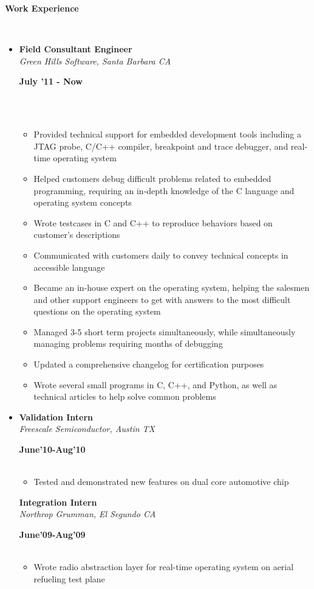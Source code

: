 \documentclass[a4paper,11pt]{article}
\newcommand{\isep}{-2 pt}
\newcommand{\lsep}{-0.5cm}
\newcommand{\resheading}[1]{{\small \colorbox{mygrey}{\begin{minipage}{0.975\textwidth}{\textbf{#1 \vphantom{p\^{E}}}}\end{minipage}}}}
\newcommand{\workexp}[4]{
\begin{minipage}[t]{7cm}
\flushleft
\textbf{#1} \\
\indent \emph{#2}\\
\end{minipage}
\begin{minipage}[t]{7cm}
\flushright
\textbf{#3} \\
\indent #4 \\
\end{minipage}
}
\begin{document}
\resheading{\textbf{Work Experience} }\\[\lsep]
\begin{itemize}
\item 
\workexp{Field Consultant Engineer}{Green Hills Software, Santa Barbara CA}{July '11 - Now}{}
\\[-0.2cm]
	\begin{itemize}\itemsep \isep
	\item Provided technical support for embedded development tools including a JTAG probe, C/C++ compiler, breakpoint and trace debugger, and real-time operating system
	\item Helped customers debug difficult problems related to embedded programming, requiring an in-depth knowledge of the C language and operating system concepts
	\item Wrote testcases in C and C++ to reproduce behaviors based on customer's descriptions
	\item Communicated with customers daily to convey technical concepts in accessible language
	\item Became an in-house expert on the operating system, helping the salesmen and other support engineers to get with answers to the most difficult  questions on the operating system
	\item Managed 3-5 short term projects simultaneously, while simultaneously managing problems requiring months of debugging
	\item Updated a comprehensive changelog for certification purposes
	\item Wrote several small programs  in C, C++, and Python, as well as technical articles to help solve common problems
	\end{itemize}

\item
\workexp{Validation Intern}{Freescale Semiconductor, Austin TX}{June'10-Aug'10}{}
	\begin{itemize}\itemsep \isep
	\item Tested and demonstrated new features on dual core automotive chip
	\end{itemize}
\workexp{Integration Intern}{Northrop Grumman, El Segundo CA}{June'09-Aug'09}{}
	\begin{itemize}\itemsep \isep
	\item Wrote radio abstraction layer for real-time operating system on aerial refueling test plane
	\end{itemize}
\end{itemize}
\end{document}
